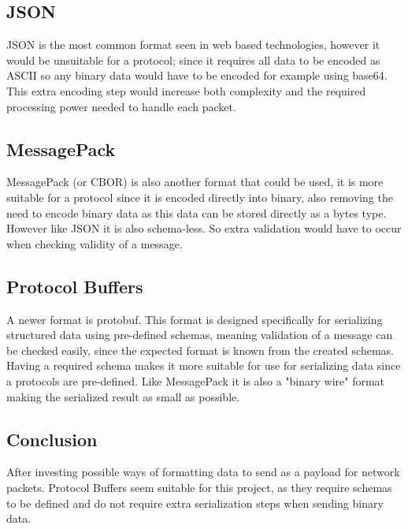 \subsection*{JSON}
JSON is the most common format seen in web based technologies, however it would be unsuitable for a protocol; since it requires all data to be encoded as ASCII so any binary data would have to be encoded for example using base64. This extra encoding step would increase both complexity and the required processing power needed to handle each packet.

\subsection*{MessagePack}
MessagePack (or CBOR) is also another format that could be used, it is more suitable for a protocol since it is encoded directly into binary, also removing the need to encode binary data as this data can be stored directly as a bytes type. However like JSON it is also schema-less. So extra validation would have to occur when checking validity of a message.

\subsection*{Protocol Buffers}
A newer format is protobuf. This format is designed specifically for serializing structured data using pre-defined schemas, meaning validation of a message can be checked easily, since the expected format is known from the created schemas. Having a required schema makes it more suitable for use for serializing data since a protocols are pre-defined. Like MessagePack it is also a "binary wire" format making the serialized result as small as possible.

\subsection*{Conclusion}
After investing possible ways of formatting data to send as a payload for network packets. Protocol Buffers seem suitable for this project, as they require schemas to be defined and do not require extra serialization steps when sending binary data.
